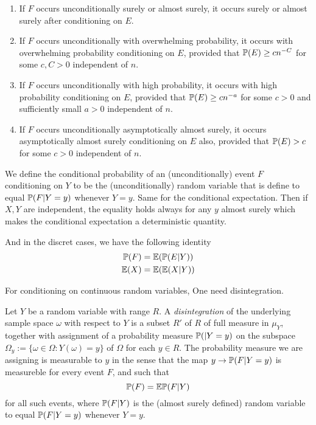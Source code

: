 \begin{example}
    \begin{enumerate}
        \item If $F$ occurs unconditionally surely or almost surely, it occurs surely or almost surely after conditioning on $E$.
        \item If $F$ occurs unconditionally with overwhelming probability, it occurs with overwhelming probability conditioning on $E$, 
        provided that $\mathbb{P} (E) \geq cn^{-C}$ for some $c,C>0$ independent of $n$.
        \item If $F$ occurs unconditionally with high probability, it occurs with high probability conditioning on $E$, 
        provided that $\mathbb{P} (E)\geq cn^{-a}$ for some $c>0$ and sufficiently small $a>0$ independent of $n$.
        \item If $F$ occurs unconditionally asymptotically almost surely, it occurs asymptotically almost surely conditioning on $E$ also,
         provided that $\mathbb{P}(E)>c$ for some $c>0$ independent of $n$.
    \end{enumerate}
\end{example}

We define the conditional probability of an (unconditionally) event $F$ conditioning on $Y$ to be the (unconditionally) random variable that is define to equal $\mathbb{P}(F|Y=y)$ whenever $Y=y$.
 Same for the conditional expectation. Then if $X,Y$ are independent, the equality holds always for any $y$ almost surely which makes the conditional expectation a deterministic quantity.
 
And in the discret cases, we have the following identity
\begin{align}
    \mathbb{P}(F) & = \mathbb{E} (\mathbb{P}(E|Y)) \\
    \mathbb{E}(X) & = \mathbb{E} (\mathbb{E}(X|Y)) 
\end{align}

For conditioning on continuous random variables,
One need disintegration.

\begin{definition}
    [Disintegration]
    Let $Y$ be a random variable with range $R$. A \textit{disintegration} of the underlying sample space $\omega$ with respect to $Y$
    is a subset $R'$ of $R$ of full measure in $\mu_Y$, together with assignment of a probability measure $\mathbb{P}(|Y=y)$ on the subspace $\Omega_y := \{\omega \in \Omega :Y(\omega)=y \}$ of $\Omega$ for each $y\in R$. The probability measure we are assigning is measurable to $y$ in the sense that the map $y\to\mathbb{P}(F|Y=y)$ is measureble for every event $F$, and such that
    \begin{equation}
        \mathbb{P}(F) = \mathbb{E} \mathbb{P}(F|Y)
    \end{equation}
    for all such events, where $\mathbb{P}(F|Y)$ is the (almost surely defined) random variable to equal $\mathbb{P}(F|Y=y)$ whenever $Y=y$.
\end{definition}


